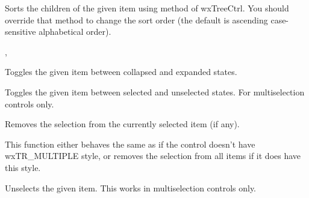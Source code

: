 
Sorts the children of the given item using
 method of wxTreeCtrl. You
should override that method to change the sort order (the default is ascending
case-sensitive alphabetical order).


, 


\label{wxtreectrltoggle}


Toggles the given item between collapsed and expanded states.


\label{wxtreectrltoggleitemselection}


Toggles the given item between selected and unselected states. For
multiselection controls only.


\label{wxtreectrlunselect}


Removes the selection from the currently selected item (if any).


\label{wxtreectrlunselectall}


This function either behaves the same as 
if the control doesn't have wxTR\_MULTIPLE style, or removes the selection from
all items if it does have this style.


\label{wxtreectrlunselectitem}


Unselects the given item. This works in multiselection controls only.







\section{}\label{wxtreeitemid}

